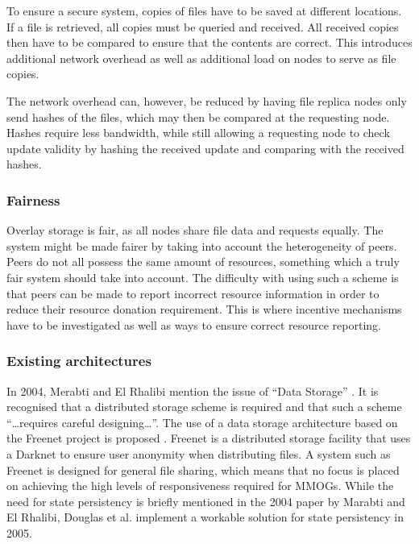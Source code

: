\documentclass[10pt,a4paper,journal,cspaper,compsoc]{IEEEtran}
\begin{document}
To ensure a secure system, copies of files have to be saved at different locations. If a file is retrieved, all copies must be queried and received.
All received copies then have to be compared to ensure that the contents are correct. This introduces additional network overhead as well as
additional load on nodes to serve as file copies.

The network overhead can, however, be reduced by having file replica nodes only send hashes of the files, which may then be compared at the
requesting node. Hashes require less bandwidth, while still allowing a requesting node to check update validity by hashing the received update and
comparing with the received hashes.

\subsubsection{Fairness}

Overlay storage is fair, as all nodes share file data and requests equally. The system might be made fairer by taking into account the heterogeneity
of peers. Peers do not all possess the same amount of resources, something which a truly fair system should take into account. The difficulty with
using such a scheme is that peers can be made to report incorrect resource information in order to reduce their resource donation requirement. This
is where incentive mechanisms have to be investigated as well as ways to ensure correct resource reporting.

\subsubsection{Existing architectures}

In 2004, Merabti and El Rhalibi mention the issue of ``Data Storage'' \cite{using_freenet_storage}. It is recognised that a distributed storage
scheme is required and that such a scheme ``\ldots requires careful designing\ldots''. The use of a data storage architecture based on the Freenet
project is proposed \cite{clarke_freenet}. Freenet is a distributed storage facility that uses a Darknet to ensure user anonymity when distributing
files. A system such as Freenet is designed for general file sharing, which means that no focus is placed on achieving the high levels of
responsiveness required for MMOGs. While the need for state persistency is briefly mentioned in the 2004 paper by Marabti and El Rhalibi, Douglas et
al. implement a workable solution for state persistency in 2005.
\end{document}
